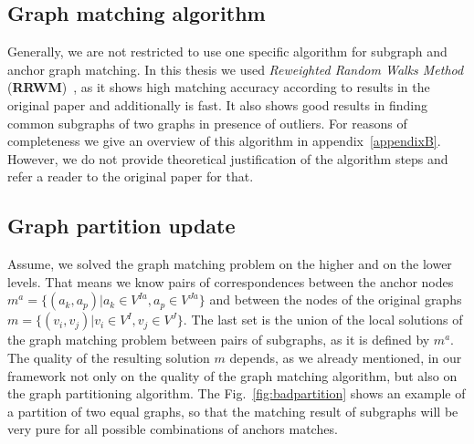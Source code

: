 \subsection{Graph matching algorithm}
Generally, we are not restricted to use one specific algorithm for subgraph and anchor graph matching. In this thesis we used \emph{Reweighted Random Walks Method} (\textbf{RRWM})~\cite{Cho2010_RRWM}, as it shows high matching accuracy according to results in the original paper and additionally is fast. It also shows good results in finding common subgraphs of two graphs in presence of outliers.
For reasons of completeness we give an overview of this algorithm in appendix~\ref{appendixB}. However, we do not provide theoretical justification of the algorithm steps and refer a reader to the original paper for that. 

\subsection{Graph partition update}
Assume, we solved the graph matching problem on the higher and on the lower levels. That means we know pairs of correspondences between the anchor nodes $m^a = \{(a_k, a_p)|a_k\in V^{Ia}, a_p\in V^{Ja}\}$ and between the nodes of the original graphs $m = \{(v_i, v_j)|v_i\in V^{I}, v_j\in V^{J}\}$. The last set is the union of the local solutions of the graph matching problem between pairs of subgraphs, as it is defined by $m^a$.
The quality of the resulting solution $m$ depends, as we already mentioned, in our framework not only on the quality of the graph matching algorithm, but also on the graph partitioning algorithm.	
The Fig.~\ref{fig:badpartition} shows an example of a partition of two equal graphs, so that the matching result of subgraphs will be very pure for all possible combinations of anchors matches.

